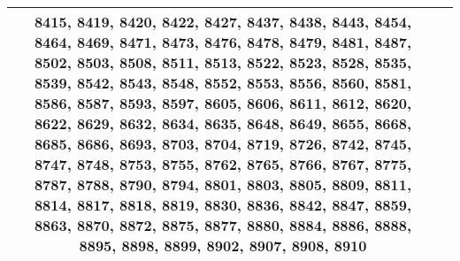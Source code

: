 \documentclass[12pt]{article}
\begin{document}
\begin{tabular}{|c|p{17cm}|}
8415, 8419, 8420, 8422, 8427, 8437, 8438, 8443, 8454, 8464, 8469, 8471, 8473, 8476, 8478, 8479, 8481, 8487, 8502, 8503, 8508, 8511, 8513, 8522, 8523, 8528, 8535, 8539, 8542, 8543, 8548, 8552, 8553, 8556, 8560, 8581, 8586, 8587, 8593, 8597, 8605, 8606, 8611, 8612, 8620, 8622, 8629, 8632, 8634, 8635, 8648, 8649, 8655, 8668, 8685, 8686, 8693, 8703, 8704, 8719, 8726, 8742, 8745, 8747, 8748, 8753, 8755, 8762, 8765, 8766, 8767, 8775, 8787, 8788, 8790, 8794, 8801, 8803, 8805, 8809, 8811, 8814, 8817, 8818, 8819, 8830, 8836, 8842, 8847, 8859, 8863, 8870, 8872, 8875, 8877, 8880, 8884, 8886, 8888, 8895, 8898, 8899, 8902, 8907, 8908, 8910} \\
    \hline
\end{tabular}
\end{document}
